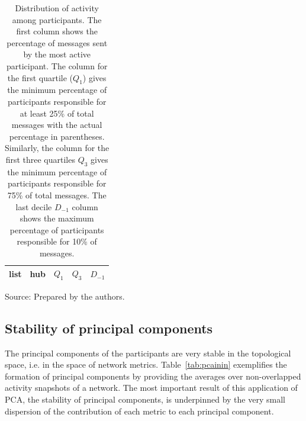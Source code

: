 \begin{table}[h]
\caption{Distribution of activity among participants.
The first column shows the percentage of messages sent by the most active participant. The column for the first quartile ($Q_1$) gives the minimum percentage of participants responsible for at least 25\% of total messages with the actual percentage in parentheses. Similarly, the column for the first three quartiles $Q_3$ gives the minimum percentage of participants responsible for 75\% of total messages.
The last decile $D_{-1}$ column shows the maximum percentage of participants responsible for 10\% of messages.}
\begin{center}
\begin{tabular}{ | l ||  c | c | c | c | }
\hline
list & hub & $ Q_1 $ & $ Q_3 $ & $D_{-1}$ \\ \hline

\end{tabular}
\end{center}
\begin{flushleft}
		Source: Prepared by the authors.\
\end{flushleft}
\label{autores}
\end{table}


\subsection{Stability of principal components}\label{prevalence}

The principal components of the participants are very stable in the topological space,
i.e. in the space of network metrics.
Table~\ref{tab:pcainin} exemplifies the formation of principal components by providing the averages over non-overlapped activity snapshots of a network. The most important result of this application of PCA, the stability of principal components, is underpinned by the very small dispersion of the contribution of each metric to each principal component.

